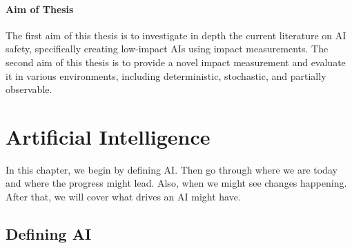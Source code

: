 \documentclass[12pt,A4]{report}
\newcommand{\autobaj}{}
\theoremstyle{definition}
\begin{document}
\subsubsection{Aim of Thesis}
The first aim of this thesis is to investigate in depth the current literature on AI safety, specifically creating low-impact AIs using impact measurements. The second aim of this thesis is to provide a novel impact measurement and evaluate it in various environments, including deterministic, stochastic, and partially observable. 


\chapter{Artificial Intelligence}
In this chapter, we begin by defining AI. Then go through where we are today and where the progress might lead. Also, when we might see changes happening. After that, we will cover what drives an AI might have.

\section{Defining AI}
\end{document}
